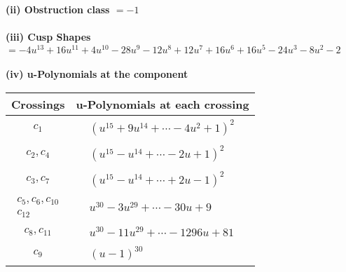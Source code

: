 \documentclass[1p]{elsarticle_modified}
\theoremstyle{definition}
\begin{document}
\flushleft \textbf{(ii) Obstruction class $= -1$}\\~\\
\flushleft \textbf{(iii) Cusp Shapes $= -4 u^{13}+16 u^{11}+4 u^{10}-28 u^9-12 u^8+12 u^7+16 u^6+16 u^5-24 u^3-8 u^2-2$}\\~\\
\newpage\renewcommand{\arraystretch}{1}
\flushleft \textbf{(iv) u-Polynomials at the component}\newline \\
\begin{tabular}{m{50pt}|m{274pt}}
Crossings & \hspace{64pt}u-Polynomials at each crossing \\
\hline $$\begin{aligned}c_{1}\end{aligned}$$&$\begin{aligned}
&(u^{15}+9 u^{14}+\cdots-4 u^2+1)^{2}
\end{aligned}$\\
\hline $$\begin{aligned}c_{2},c_{4}\end{aligned}$$&$\begin{aligned}
&(u^{15}- u^{14}+\cdots-2 u+1)^{2}
\end{aligned}$\\
\hline $$\begin{aligned}c_{3},c_{7}\end{aligned}$$&$\begin{aligned}
&(u^{15}- u^{14}+\cdots+2 u-1)^{2}
\end{aligned}$\\
\hline $$\begin{aligned}c_{5},c_{6},c_{10}\\c_{12}\end{aligned}$$&$\begin{aligned}
&u^{30}-3 u^{29}+\cdots-30 u+9
\end{aligned}$\\
\hline $$\begin{aligned}c_{8},c_{11}\end{aligned}$$&$\begin{aligned}
&u^{30}-11 u^{29}+\cdots-1296 u+81
\end{aligned}$\\
\hline $$\begin{aligned}c_{9}\end{aligned}$$&$\begin{aligned}
&(u-1)^{30}
\end{aligned}$\\
\hline
\end{tabular}\\~\\
\end{document}
